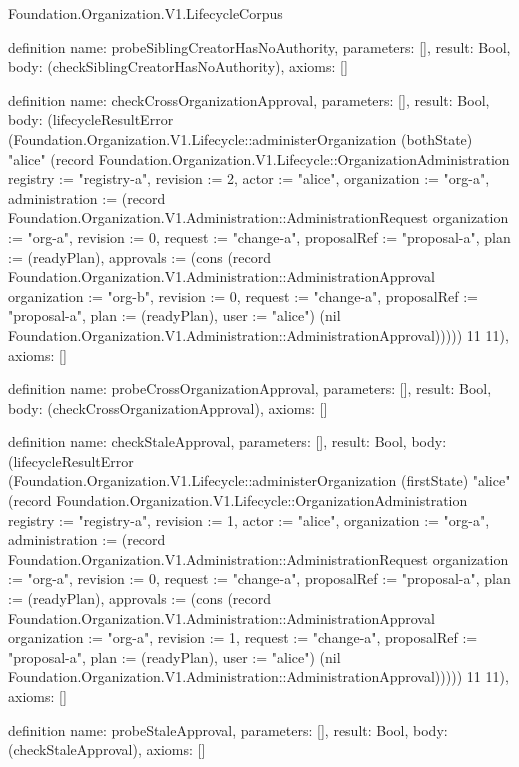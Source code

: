 \begin{lexlean}{Foundation.Organization.V1.LifecycleCorpus}
\begin{semanticmodule}
definition{
  name: probeSiblingCreatorHasNoAuthority,
  parameters: [],
  result: Bool,
  body: (checkSiblingCreatorHasNoAuthority),
  axioms: []
}

definition{
  name: checkCrossOrganizationApproval,
  parameters: [],
  result: Bool,
  body: (lifecycleResultError (Foundation.Organization.V1.Lifecycle::administerOrganization (bothState) "alice" (record Foundation.Organization.V1.Lifecycle::OrganizationAdministration {registry := "registry-a", revision := 2, actor := "alice", organization := "org-a", administration := (record Foundation.Organization.V1.Administration::AdministrationRequest {organization := "org-a", revision := 0, request := "change-a", proposalRef := "proposal-a", plan := (readyPlan), approvals := (cons (record Foundation.Organization.V1.Administration::AdministrationApproval {organization := "org-b", revision := 0, request := "change-a", proposalRef := "proposal-a", plan := (readyPlan), user := "alice"}) (nil Foundation.Organization.V1.Administration::AdministrationApproval))})})) 11 11),
  axioms: []
}

definition{
  name: probeCrossOrganizationApproval,
  parameters: [],
  result: Bool,
  body: (checkCrossOrganizationApproval),
  axioms: []
}

definition{
  name: checkStaleApproval,
  parameters: [],
  result: Bool,
  body: (lifecycleResultError (Foundation.Organization.V1.Lifecycle::administerOrganization (firstState) "alice" (record Foundation.Organization.V1.Lifecycle::OrganizationAdministration {registry := "registry-a", revision := 1, actor := "alice", organization := "org-a", administration := (record Foundation.Organization.V1.Administration::AdministrationRequest {organization := "org-a", revision := 0, request := "change-a", proposalRef := "proposal-a", plan := (readyPlan), approvals := (cons (record Foundation.Organization.V1.Administration::AdministrationApproval {organization := "org-a", revision := 1, request := "change-a", proposalRef := "proposal-a", plan := (readyPlan), user := "alice"}) (nil Foundation.Organization.V1.Administration::AdministrationApproval))})})) 11 11),
  axioms: []
}

definition{
  name: probeStaleApproval,
  parameters: [],
  result: Bool,
  body: (checkStaleApproval),
  axioms: []
}


\end{semanticmodule}
\end{lexlean}
